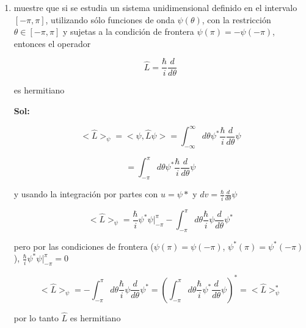 \documentclass[12pt,a4paper]{article}
\begin{document}
\begin{enumerate}
    
    
    
    
    
    
    
    
    
    
    
    \item muestre que si se estudia un sistema unidimensional definido en el intervalo $[-\pi,\pi]$, utilizando sólo funciones de onda $\psi(\theta)$, con la restricción $\theta \in [-\pi,\pi]$ y sujetas a la condición de frontera $\psi(\pi)= -\psi(-\pi)$, entonces el operador
    
    \begin{equation*}
        \hat{L} = \frac{\hbar}{i} \frac{d}{d \theta}
    \end{equation*}
    
    es hermitiano
    
    \textbf{Sol:}
    
    \begin{equation*}
        <\hat{L}>_\psi = <\psi, \hat{L} \psi> = \int_{-\infty}^{\infty} d\theta \psi^*  \frac{\hbar}{i} \frac{d}{d \theta} \psi
    \end{equation*}
    
    \begin{equation*}
        = \int_{-\pi}^{\pi} d \theta \psi^* \frac{\hbar}{i} \frac{d}{d \theta} \psi
    \end{equation*}
    
    y usando la integración por partes con $u = \psi
    *$ y $dv = \frac{\hbar}{i} \frac{d}{d \theta} \psi$
    
    \begin{equation*}
        <\hat{L}>_\psi = \frac{\hbar}{i} \psi^* \psi |_{-\pi}^{\pi}  - \int_{-\pi}^{\pi} d \theta  \frac{\hbar}{i} \psi \frac{d}{d \theta} \psi^*
    \end{equation*}
    
    pero por las condiciones de frontera ($\psi(\pi) = \psi(-\pi)$, $\psi^*(\pi) = \psi^*(-\pi)$), $\frac{\hbar}{i} \psi^* \psi |_{-\pi}^{\pi} = 0$
    
    \begin{equation*}
        <\hat{L}>_\psi = - \int_{-\pi}^{\pi} d \theta  \frac{\hbar}{i} \psi \frac{d}{d \theta} \psi^* = (\int_{-\pi}^{\pi} d \theta  \frac{\hbar}{i} \psi^* \frac{d}{d \theta} \psi)^* = <\hat{L}>_\psi^*
    \end{equation*}
    
    por lo tanto $\hat{L}$ es hermitiano
    

\end{enumerate}
\end{document}
